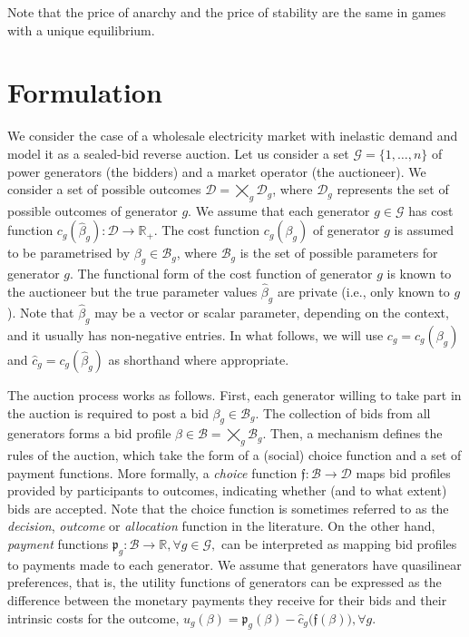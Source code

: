 \documentclass{article}
\begin{document}
Note that the price of anarchy and the price of stability are the same in games with a unique equilibrium.

\section{Formulation}

We consider the case of a wholesale electricity market with inelastic demand and model it as a sealed-bid reverse auction. Let us consider a set $\mathcal{G} = \{1, \ldots, n\}$ of power generators (the bidders) and a market operator (the auctioneer). We consider a set of possible outcomes $\mathcal{D} = \bigtimes_g \mathcal{D}_g$, where $\mathcal{D}_g$ represents the set of possible outcomes of generator $g$. We assume that each generator $g \in \mathcal{G}$ has cost function $c_g(\hat{\beta}_g): \mathcal{D} \rightarrow \mathbb{R}_+$. The cost function $c_g(\beta_g)$ of generator $g$ is assumed to be parametrised by $\beta_g \in \mathcal{B}_g$, where $\mathcal{B}_g$ is the set of possible parameters for generator $g$. The functional form of the cost function of generator $g$ is known to the auctioneer but the true parameter values $\hat{\beta}_g$ are private (i.e., only known to $g$). Note that $\hat{\beta}_g$ may be a vector or scalar parameter, depending on the context, and it usually has non-negative entries. In what follows, we will use $c_g = c_g(\beta_g)$ and $\hat{c}_g = c_g(\hat{\beta}_g)$ as shorthand where appropriate.

The auction process works as follows. First, each generator willing to take part in the auction is required to post a bid $\beta_g \in \mathcal{B}_g$. The collection of bids from all generators forms a bid profile $\beta \in \mathcal{B} = \bigtimes_g \mathcal{B}_g$. Then, a mechanism defines the rules of the auction, which take the form of a (social) choice function and a set of payment functions. More formally, a \textit{choice} function $\mathfrak{f}: \mathcal{B} \rightarrow \mathcal{D}$ maps bid profiles provided by participants to outcomes, indicating whether (and to what extent) bids are accepted. Note that the choice function is sometimes referred to as the \textit{decision}, \textit{outcome} or \textit{allocation} function in the literature. On the other hand, \textit{payment} functions $\mathfrak{p}_g: \mathcal{B} \rightarrow \mathbb{R}, \forall g \in \mathcal{G},$  can be interpreted as mapping bid profiles to payments made to each generator. We assume that generators have quasilinear preferences, that is, the utility functions of generators can be expressed as the difference between the monetary payments they receive for their bids and their intrinsic costs for the outcome, $u_g(\beta) = \mathfrak{p}_g(\beta) - \hat{c}_g\big(\mathfrak{f}(\beta)\big), \forall g$.
\end{document}
